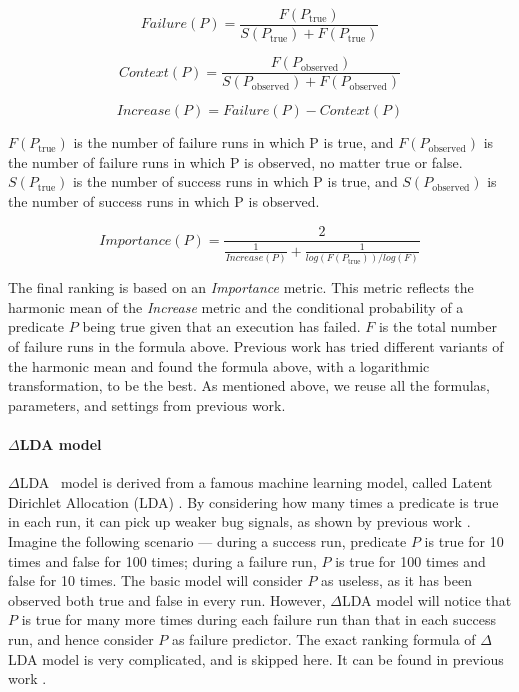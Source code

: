 \[
Failure(P) =  \frac{F(P_{\text{true}})}{S(P_{\text{true}})+F(P_{\text{true}})}
\]

\[
Context(P) =  \frac{F(P_{\text{observed}})}{S(P_{\text{observed}})+F(P_{\text{observed}})}
\]

\[
Increase(P) =  Failure(P) - Context(P)
\]

$F(P_{\text{true}})$ is the number of failure runs in which P is true, 
and $F(P_{\text{observed}})$
is the number of failure runs in which P is observed, no matter true or false. 
$S(P_{\text{true}})$ is the number of success runs 
in which P is true, and $S(P_{\text{observed}})$
is the number of success runs in which P is observed. 

 
\[
Importance(P) =  \frac{2}{\frac{1}{Increase(P)} + \frac{1}{log(F(P_{\text{true}}))/log(F)}}
\]

The final ranking is based on an \textit{Importance} metric. This metric
reflects the harmonic mean of
the \textit{Increase} metric and the conditional probability of a predicate $P$
being true given that an execution has failed. 
$F$ is the total number of failure runs in the formula above.
Previous work 
\cite{liblit05}
has tried different
variants of the harmonic mean and found the formula above, with a logarithmic
transformation, to be the best. As mentioned above, we reuse all the formulas, 
parameters, and settings from previous work. 

\paragraph{$\Delta$LDA model}
$\Delta$LDA~\cite{Delta-LDA} model is derived from a famous machine learning
model, called Latent Dirichlet Allocation 
(LDA) \cite{LDA}.
By considering how many times a predicate is true 
in each run, it can pick up weaker bug signals, as shown by previous work \cite{Delta-LDA}.
Imagine the following scenario ---
during a success run, predicate $P$ is true for
10 times and false for 100 times; during a failure run, $P$ is true for 
100 times and false for 10 times. The basic model will consider $P$ as useless,
as it has been observed both true and false in every run. However, $\Delta$LDA model will 
notice that $P$ is true for many more times during each failure run than that in 
each success
run, and hence consider $P$ as failure predictor. The exact ranking formula of
$\Delta$LDA model is very complicated, and is skipped here. It can be found
in previous work \cite{Delta-LDA}.
  
